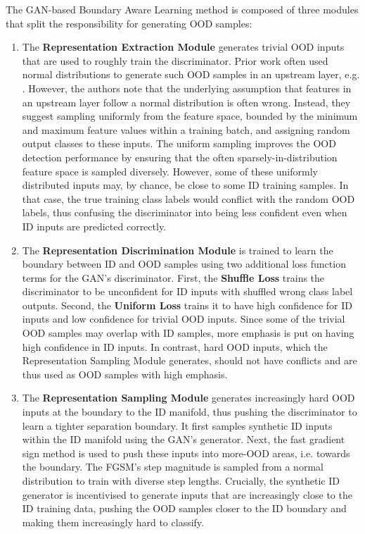 \newpar The GAN-based Boundary Aware Learning method is composed of three modules that split the responsibility for generating OOD samples:
\begin{enumerate}
    \item The \textbf{Representation Extraction Module} generates trivial OOD inputs that are used to roughly train the discriminator. Prior work often used normal distributions to generate such OOD samples in an upstream layer, e.g. \cite{distance-confidence-2017, ood-adversarial-detection-2018}. However, the authors note that the underlying assumption that features in an upstream layer follow a normal distribution is often wrong. Instead, they suggest sampling uniformly from the feature space, bounded by the minimum and maximum feature values within a training batch, and assigning random output classes to these inputs. The uniform sampling improves the OOD detection performance by ensuring that the often sparsely-in-distribution feature space is sampled diversely. However, some of these uniformly distributed inputs may, by chance, be close to some ID training samples. In that case, the true training class labels would conflict with the random OOD labels, thus confusing the discriminator into being less confident even when ID inputs are predicted correctly.
    \item The \textbf{Representation Discrimination Module} is trained to learn the boundary between ID and OOD samples using two additional loss function terms for the GAN's discriminator. First, the \textbf{Shuffle Loss} trains the discriminator to be unconfident for ID inputs with shuffled wrong class label outputs. Second, the \textbf{Uniform Loss} trains it to have high confidence for ID inputs and low confidence for trivial OOD inputs. Since some of the trivial OOD samples may overlap with ID samples, more emphasis is put on having high confidence in ID inputs. In contrast, hard OOD inputs, which the Representation Sampling Module generates, should not have conflicts and are thus used as OOD samples with high emphasis.
    \item The \textbf{Representation Sampling Module} generates increasingly hard OOD inputs at the boundary to the ID manifold, thus pushing the discriminator to learn a tighter separation boundary. It first samples synthetic ID inputs within the ID manifold using the GAN's generator. Next, the fast gradient sign method \cite{fast-gradient-2014} is used to push these inputs into more-OOD areas, i.e. towards the boundary. The FGSM's step magnitude is sampled from a normal distribution to train with diverse step lengths. Crucially, the synthetic ID generator is incentivised to generate inputs that are increasingly close to the ID training data, pushing the OOD samples closer to the ID boundary and making them increasingly hard to classify.
\end{enumerate}

